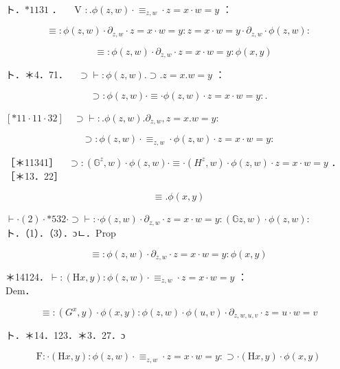 \documentclass[10pt]{article}
\begin{document}
ト．$* 1131$ ．$\quad$ V $: . \phi(z, w) \cdot \equiv_{z, w} \cdot z=x \cdot w=y$ ：

$$
\equiv: \phi(z, w) \cdot \partial_{z, w} \cdot z=x \cdot w=y: z=x \cdot w=y \cdot \partial_{z, w} \cdot \phi(z, w):
$$


\begin{equation*}
[* 13 \cdot 21] \quad \equiv: \phi(z, w) \cdot \partial_{z, w} \cdot z=x \cdot w=y: \phi(x, y) \tag{1}
\end{equation*}


ト．＊4．71．$\quad \supset \vdash: \phi(z, w) . \supset . z=x . w=y$ ：

$$
\supset: \phi(z, w) \cdot \equiv \cdot \phi(z, w) \cdot z=x \cdot w=y: .
$$

$[* 11 \cdot 11 \cdot 32] \quad \supset \vdash: . \phi(z, w) . \partial_{z, w}, z=x . w=y:$

$$
\supset: \phi(z, w) \cdot \equiv_{z, w} \cdot \phi(z, w) \cdot z=x \cdot w=y:
$$

［＊11341］$\quad \supset:\left(\mathbb{G}^{z}, w\right) \cdot \phi(z, w) \cdot \equiv \cdot\left(H^{z}, w\right) \cdot \phi(z, w) \cdot z=x \cdot w=y$ ．\\
［＊13．22］


\begin{equation*}
\equiv . \phi(x, y) \tag{2}
\end{equation*}


$\vdash \cdot(2) \cdot * 532 \cdot \supset \vdash: \cdot \phi(z, w) \cdot \partial_{z, w} \cdot z=x \cdot w=y:(\mathbb{G} z, w) \cdot \phi(z, w):$\\
ト．（1）．（3）．ɔㄴ．Prop


\begin{equation*}
\equiv: \phi(z, w) \cdot \partial_{z, w} \cdot z=x \cdot w=y: \phi(x, y) \tag{3}
\end{equation*}


＊14124．$\vdash:(\mathrm{H} x, y): \phi(z, w) \cdot \equiv_{z, w} \cdot z=x \cdot w=y$ ：\\
Dem．

$$
\equiv:\left(G^{x}, y\right) \cdot \phi(x, y): \phi(z, w) \cdot \phi(u, v) \cdot \partial_{z, w, u, v} \cdot z=u \cdot w=v
$$

ト．＊14．123．＊3．27．ɔ


\begin{equation*}
\mathrm{F}: \cdot(\mathrm{H} x, y): \phi(z, w) \cdot \equiv_{z, w} \cdot z=x \cdot w=y: \supset \cdot(\mathrm{H} x, y) \cdot \phi(x, y) \tag{1}
\end{equation*}
\end{document}
